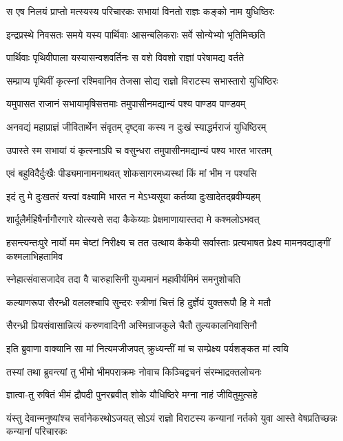 \twolineshloka
{स एष निलयं प्राप्तो मत्स्यस्य परिचारकः}
{सभायां विनतो राज्ञः कङ्को नाम युधिष्ठिरः}


\twolineshloka
{इन्द्रप्रस्थे निवसतः समये यस्य पार्थिवाः}
{आसन्बलिकराः सर्वे सोन्येभ्यो भृतिमिच्छति}


\twolineshloka
{पार्थिवाः पृथिवीपाला यस्यासन्वशवर्तिनः}
{स वशे विवशो राज्ञां परेषामद्य वर्तते}


\twolineshloka
{सम्प्राप्य पृथिवीं कृत्स्नां रश्मिवानिव तेजसा}
{सोद्य राज्ञो विराटस्य सभास्तारो युधिष्ठिरः}


\twolineshloka
{यमुपासत राजानं सभायामृषिसत्तमाः}
{तमुपासीनमद्यान्यं पश्य पाण्डव पाण्डवम्}


\twolineshloka
{अनवद्यं महाप्राज्ञं जीवितार्थेन संवृतम्}
{दृष्ट्वा कस्य न दुःखं स्याद्धर्मराजं युधिष्ठिरम्}


\twolineshloka
{उपास्ते स्म सभायां यं कृत्स्नाऽपि च वसुन्धरा}
{तमुपासीनमद्यान्यं पश्य भारत भारतम्}


\twolineshloka
{एवं बहुविदैर्दुःखैः पीड्यमानामनाथवत्}
{शोकसागरमध्यस्थां किं मां भीम न पश्यसि}


\twolineshloka
{इदं तु मे दुःखतरं यत्त्वां वक्ष्यामि भारत}
{न मेऽभ्यसूया कर्तव्या दुःखादेतद्ब्रवीम्यहम्}


\twolineshloka
{शार्दूलैर्महिषैर्नागौरगारे योत्स्यसे सदा}
{कैकेय्याः प्रेक्षमाणायास्तदा मे कश्मलोऽभवत्}


\onelineshloka
{हसन्त्यन्तःपुरे नार्यो मम चेष्टां निरीक्ष्य च}
\twolineshloka
{तत उत्थाय कैकेयी सर्वास्ताः प्रत्यभाषत}
{प्रेक्ष्य मामनवद्याङ्गीं कश्मलाभिहतामिव}


\twolineshloka
{स्नेहात्संवासजादेव तदा वै चारुहासिनी}
{युध्यमानं महावीर्यमिमं समनुशोचति}


\twolineshloka
{कल्याणरूपा सैरन्ध्री वललश्चापि सुन्दरः}
{स्त्रीणां चित्तं हि दुर्ज्ञेयं युक्तरूपौ हि मे मतौ}


\twolineshloka
{सैरन्ध्री प्रियसंवासान्नित्यं करुणवादिनी}
{अस्मिन्राजकुले चैतौ तुल्यकालनिवासिनौ}


\twolineshloka
{इति ब्रुवाणा वाक्यानि सा मां नित्यमजीजपत्}
{क्रुध्यन्तीं मां च सम्प्रेक्ष्य पर्यशङ्कत मां त्वयि}


\twolineshloka
{तस्यां तथा ब्रुवन्त्यां तु भीमो भीमपराक्रमः}
{नोवाच किञ्चिद्वचनं संरम्भाद्रक्तलोचनः}


\twolineshloka
{ज्ञात्वा-तु रुषितं भीमं द्रौपदी पुनरब्रवीत्}
{शोके यौधिष्ठिरे मग्ना नाहं जीवितुमुत्सहे}


\threelineshloka
{यंस्तु देवान्मनुष्यांश्च सर्वानेकरथोऽजयत्}
{सोऽयं राज्ञो विराटस्य कन्यानां नर्तको युवा}
{आस्ते वेषप्रतिच्छन्नः कन्यानां परिचारकः}


